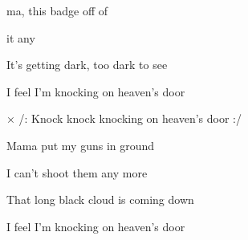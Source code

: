 

\zs
{}ma,  this badge off of  

  it any 

It's getting dark, too dark to see

I feel I'm knocking on heaven's door
\ks

× /: Knock knock knocking on heaven's door :/
\kr

\zs
Mama put my guns in ground

I can't shoot them any more

That long black cloud is coming down

I feel I'm knocking on heaven's door
\ks


\zr \kr
\kp






















